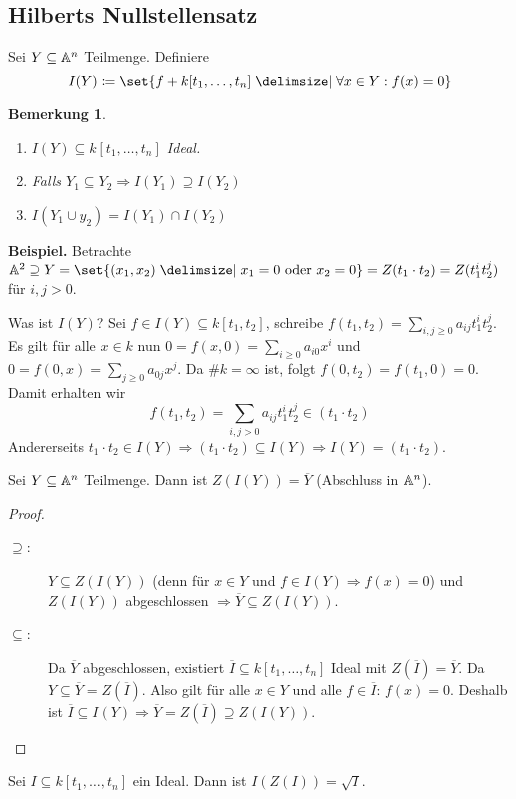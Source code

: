 \documentclass[12pt,a4paper]{scrartcl}
\theoremstyle{cplain}
\theoremstyle{cdef}
\newtheorem{beme}[thmcounter]{Bemerkung}
\begin{document}
\subsection{Hilberts Nullstellensatz}
\begin{defi}
	Sei $Y\subseteq \mathbb A^n$ Teilmenge. Definiere
	$$I(Y)\coloneqq \set{f+k[t_1,\dots, t_n]\given \forall x\in Y: f(x) = 0}$$
\end{defi}
\begin{beme}
	\leavevmode
	\begin{enumerate} 
		\item $I(Y) \subseteq k[t_1,\dots, t_n]$ Ideal.
		\item Falls $Y_1\subseteq Y_2\Rightarrow I(Y_1)\supseteq I(Y_2)$
		\item $I(Y_1\cup y_2) = I(Y_1)\cap I(Y_2)$
	\end{enumerate}
\end{beme}

\noindent
\textbf{Beispiel.}
	Betrachte $\IA^2 \supseteq Y = \set {(x_1,x_2)\given x_1 = 0\text{ oder } x_2 = 0} = Z(t_1\cdot t_2) = Z(t_1^it_2^j)$ für $i,j>0$.
	
	Was ist $I(Y)$? Sei $f\in I(Y)\subseteq k[t_1,t_2]$, schreibe $f(t_1,t_2) = \sum_{i,j\geq 0}a_{ij}t_1^it_2^j$. Es gilt für alle $x\in k$ nun $0 = f(x,0) = \sum_{i\geq0}a_{i0}x^i$ und $0 = f(0,x) = \sum_{j\geq 0} a_{0j}x^j$. Da $\#k = \infty $ ist, folgt $f(0,t_2) = f(t_1,0) = 0$. Damit erhalten wir
	$$f(t_1,t_2) = \sum_{i,j>0}a_{ij}t_1^it_2^j\in (t_1\cdot t_2)$$
	Andererseits $t_1\cdot t_2\in I(Y) \Rightarrow (t_1\cdot t_2)\subseteq I(Y)\Rightarrow I(Y) = (t_1\cdot t_2)$.

\begin{lem}
	Sei $Y\subseteq \mathbb A^n$ Teilmenge. Dann ist $Z(I(Y)) = \overline{Y}$ (Abschluss in $\mathbb A^n$).
\end{lem}
\begin{proof}
	\leavevmode
	\begin{description}
		\item[\glqq$\supseteq$\grqq:] $Y\subseteq Z(I(Y))$ (denn für $x\in Y$ und $f\in I(Y)\Rightarrow f(x) = 0$) und $Z(I(Y))$ abgeschlossen $\Rightarrow \overline{Y}\subseteq Z(I(Y))$.
		\item[\glqq$\subseteq$\grqq:] Da $\overline{Y}$ abgeschlossen, existiert $\overline{I}\subseteq k[t_1,\dots, t_n]$ Ideal mit $Z(\overline{I}) = \overline{Y}$. Da $Y\subseteq \overline{Y} = Z(\overline{I})$. Also gilt für alle $x\in Y$ und alle $f\in\overline{I}$: $f(x) = 0$. Deshalb ist $\overline{I}\subseteq I(Y)\Rightarrow \overline{Y} = Z(\overline{I}) \supseteq Z(I(Y))$.
	\end{description}
\end{proof}
\begin{satz}
	Sei $I\subseteq k[t_1,\dots, t_n]$ ein Ideal. Dann ist $I(Z(I)) = \sqrt{I}$. 
\end{satz}
\end{document}
